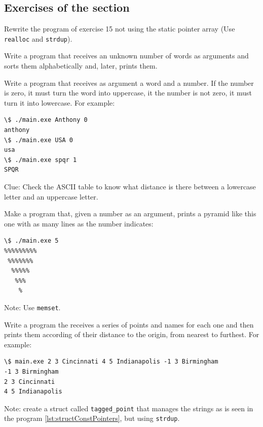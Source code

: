 \documentclass[a4paper]{article}
\begin{document}
\subsection{Exercises of the section}
\begin{exercises}[resume*]
\item Rewrite the program of exercise 15 not using the static pointer array
(Use \verb!realloc! and \verb!strdup!).

\item Write a program that receives an unknown number of words as arguments and
sorts them alphabetically and, later, prints them.
\item Write a program that receives as argument a word and a number. If the
number is zero, it must turn the word into uppercase, it the number is not
zero, it must turn it into lowercase. For example:

\noindent
\begin{minipage}[H]{\linewidth}
\begin{lstlisting}[style=terminalStyle]
\$ ./main.exe Anthony 0
anthony
\$ ./main.exe USA 0
usa
\$ ./main.exe spqr 1
SPQR
\end{lstlisting}
\end{minipage}

Clue: Check the ASCII table to know what distance is there between a lowercase
letter and an uppercase letter.
\item Make a program that, given a number as an argument, prints a pyramid like
this one with as many lines as the number indicates:

\noindent
\begin{minipage}[H]{\linewidth}
\begin{lstlisting}[style=terminalStyle]
\$ ./main.exe 5
%%%%%%%%%
 %%%%%%%
  %%%%%
   %%%
    %
\end{lstlisting}
\end{minipage}

Note: Use \verb+memset+.

\item Write a program the receives a series of points and names for each one
and then prints them according of their distance to the origin, from nearest to
furthest. For example:

\noindent
\begin{minipage}[H]{\linewidth}
\begin{lstlisting}[style=terminalStyle]
\$ main.exe 2 3 Cincinnati 4 5 Indianapolis -1 3 Birmingham
-1 3 Birmingham
2 3 Cincinnati
4 5 Indianapolis
\end{lstlisting}
Note: create a struct called \verb!tagged_point! that manages the strings as
is seen in the program
\ref{lst:structConstPointers}, but using \verb!strdup!.
\end{minipage}
\end{exercises}
\end{document}
